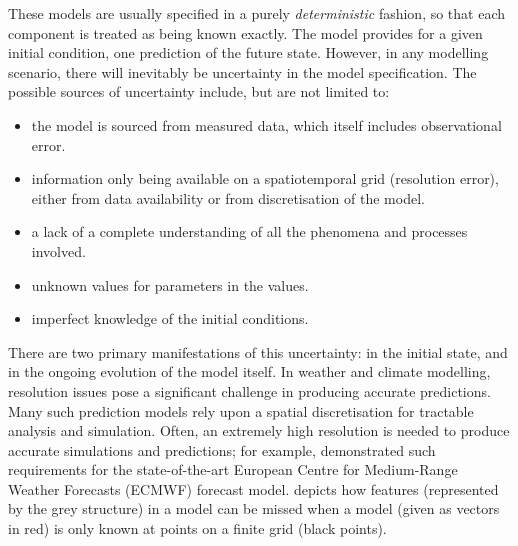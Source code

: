 These models are usually specified in a purely \emph{deterministic} fashion, so that each component is treated as being known exactly.
The model provides for a given initial condition, one prediction of the future state.
However, in any modelling scenario, there will inevitably be uncertainty in the model specification.
The possible sources of uncertainty include, but are not limited to:
\begin{itemize}
	\item the model is sourced from measured data, which itself includes observational error.
	\item information only being available on a spatiotemporal grid (resolution error), either from data availability or from discretisation of the model.
	\item a lack of a complete understanding of all the phenomena and processes involved.
	\item unknown values for parameters in the values.
	\item imperfect knowledge of the initial conditions.
\end{itemize}
There are two primary manifestations of this uncertainty: in the initial state, and in the ongoing evolution of the model itself.
In weather and climate modelling, resolution issues pose a significant challenge in producing accurate predictions.
Many such prediction models rely upon a spatial discretisation for tractable analysis and simulation.
Often, an extremely high resolution is needed to produce accurate simulations and predictions; for example, \citet{DawsonEtAl_2012_SimulatingRegimeStructures} demonstrated such requirements for the state-of-the-art European Centre for Medium-Range Weather Forecasts (ECMWF) forecast model.
 depicts how features (represented by the grey structure) in a model can be missed when a model (given as vectors in red) is only known at points on a finite grid (black points).


